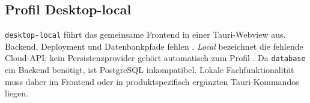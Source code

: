 \subsection{Profil Desktop-local}
\label{subsec:profil-desktop-local}

\texttt{desktop-local} führt das gemeinsame Frontend in einer Tauri-Webview
aus. Backend, Deployment und Datenbankpfade fehlen
\parencite{kleiveist2026profiles}. \emph{Local} bezeichnet die fehlende
Cloud-API; kein Persistenzprovider gehört automatisch zum Profil
\parencite{kleiveist2026persistence}. Da \texttt{database} ein Backend
benötigt, ist PostgreSQL inkompatibel.
Lokale Fachfunktionalität muss daher im Frontend oder in produktspezifisch
ergänzten Tauri-Kommandos liegen.
